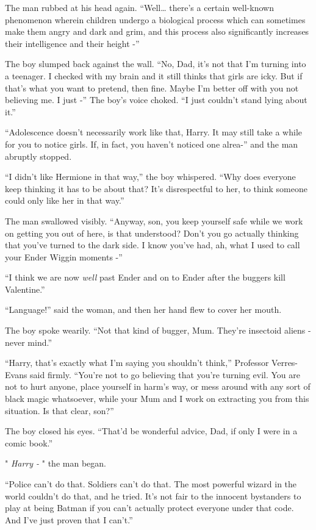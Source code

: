 The man rubbed at his head again. ``Well\ldots{} there's a certain
well-known phenomenon wherein children undergo a biological process
which can sometimes make them angry and dark and grim, and this process
also significantly increases their intelligence and their height -''

The boy slumped back against the wall. ``No, Dad, it's not that I'm
turning into a teenager. I checked with my brain and it still thinks
that girls are icky. But if that's what you want to pretend, then fine.
Maybe I'm better off with you not believing me. I just -'' The boy's
voice choked. ``I just couldn't stand lying about it.''

``Adolescence doesn't necessarily work like that, Harry. It may still
take a while for you to notice girls. If, in fact, you haven't noticed
one alrea-'' and the man abruptly stopped.

``I didn't like Hermione in that way,'' the boy whispered. ``Why does
everyone keep thinking it has to be about that? It's disrespectful to
her, to think someone could only like her in that way.''

The man swallowed visibly. ``Anyway, son, you keep yourself safe while
we work on getting you out of here, is that understood? Don't you go
actually thinking that you've turned to the dark side. I know you've
had, ah, what I used to call your Ender Wiggin moments -''

``I think we are now \emph{well} past Ender and on to Ender after the
buggers kill Valentine.''

``Language!'' said the woman, and then her hand flew to cover her mouth.

The boy spoke wearily. ``Not that kind of bugger, Mum. They're insectoid
aliens - never mind.''

``Harry, that's exactly what I'm saying you shouldn't think,'' Professor
Verres-Evans said firmly. ``You're not to go believing that you're
turning evil. You are not to hurt anyone, place yourself in harm's way,
or mess around with any sort of black magic whatsoever, while your Mum
and I work on extracting you from this situation. Is that clear, son?''

The boy closed his eyes. ``That'd be wonderful advice, Dad, if only I
were in a comic book.''

" \emph{Harry -} " the man began.

``Police can't do that. Soldiers can't do that. The most powerful wizard
in the world couldn't do that, and he tried. It's not fair to the
innocent bystanders to play at being Batman if you can't actually
protect everyone under that code. And I've just proven that I can't.''

